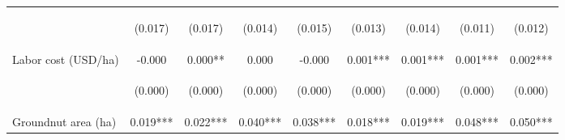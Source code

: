 \begin{center}
\begin{tabular}{lcccccccc}
\vspace{4pt} & \begin{footnotesize}(0.017)\end{footnotesize} & \begin{footnotesize}(0.017)\end{footnotesize} & \begin{footnotesize}(0.014)\end{footnotesize} & \begin{footnotesize}(0.015)\end{footnotesize} & \begin{footnotesize}(0.013)\end{footnotesize} & \begin{footnotesize}(0.014)\end{footnotesize} & \begin{footnotesize}(0.011)\end{footnotesize} & \begin{footnotesize}(0.012)\end{footnotesize} \\
Labor cost (USD/ha) & -0.000 & 0.000** & 0.000 & -0.000 & 0.001*** & 0.001*** & 0.001*** & 0.002*** \\
\vspace{4pt} & \begin{footnotesize}(0.000)\end{footnotesize} & \begin{footnotesize}(0.000)\end{footnotesize} & \begin{footnotesize}(0.000)\end{footnotesize} & \begin{footnotesize}(0.000)\end{footnotesize} & \begin{footnotesize}(0.000)\end{footnotesize} & \begin{footnotesize}(0.000)\end{footnotesize} & \begin{footnotesize}(0.000)\end{footnotesize} & \begin{footnotesize}(0.000)\end{footnotesize} \\
Groundnut area (ha) & 0.019*** & 0.022*** & 0.040*** & 0.038*** & 0.018*** & 0.019*** & 0.048*** & 0.050*** \\

\end{tabular}
\end{center}

